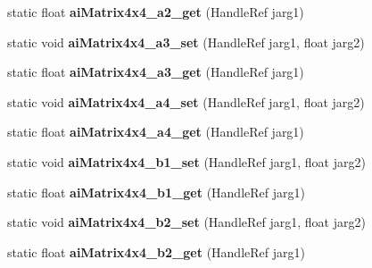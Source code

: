 \begin{DoxyCompactItemize}
\item 
\hypertarget{class_assimp_p_i_n_v_o_k_e_aa40f47aa102f2d9dbb7b108167ca72e9}{static float {\bfseries ai\+Matrix4x4\+\_\+a2\+\_\+get} (Handle\+Ref jarg1)}\label{class_assimp_p_i_n_v_o_k_e_aa40f47aa102f2d9dbb7b108167ca72e9}

\item 
\hypertarget{class_assimp_p_i_n_v_o_k_e_a34d8be79912054933938913ccb5c8338}{static void {\bfseries ai\+Matrix4x4\+\_\+a3\+\_\+set} (Handle\+Ref jarg1, float jarg2)}\label{class_assimp_p_i_n_v_o_k_e_a34d8be79912054933938913ccb5c8338}

\item 
\hypertarget{class_assimp_p_i_n_v_o_k_e_a928ad6beb47bf2ab6b78dbe0eca28973}{static float {\bfseries ai\+Matrix4x4\+\_\+a3\+\_\+get} (Handle\+Ref jarg1)}\label{class_assimp_p_i_n_v_o_k_e_a928ad6beb47bf2ab6b78dbe0eca28973}

\item 
\hypertarget{class_assimp_p_i_n_v_o_k_e_a745cdcf37c74d8b91785ecf8004fc46d}{static void {\bfseries ai\+Matrix4x4\+\_\+a4\+\_\+set} (Handle\+Ref jarg1, float jarg2)}\label{class_assimp_p_i_n_v_o_k_e_a745cdcf37c74d8b91785ecf8004fc46d}

\item 
\hypertarget{class_assimp_p_i_n_v_o_k_e_acdf40885304ca26516e7a23203ebf7cb}{static float {\bfseries ai\+Matrix4x4\+\_\+a4\+\_\+get} (Handle\+Ref jarg1)}\label{class_assimp_p_i_n_v_o_k_e_acdf40885304ca26516e7a23203ebf7cb}

\item 
\hypertarget{class_assimp_p_i_n_v_o_k_e_aabae0682c65f806462e4e9aa87e36da6}{static void {\bfseries ai\+Matrix4x4\+\_\+b1\+\_\+set} (Handle\+Ref jarg1, float jarg2)}\label{class_assimp_p_i_n_v_o_k_e_aabae0682c65f806462e4e9aa87e36da6}

\item 
\hypertarget{class_assimp_p_i_n_v_o_k_e_af5d02d02c470ad27e147fbdd949979b1}{static float {\bfseries ai\+Matrix4x4\+\_\+b1\+\_\+get} (Handle\+Ref jarg1)}\label{class_assimp_p_i_n_v_o_k_e_af5d02d02c470ad27e147fbdd949979b1}

\item 
\hypertarget{class_assimp_p_i_n_v_o_k_e_a588b7819b8ced4b1c41ee160b3a60e1b}{static void {\bfseries ai\+Matrix4x4\+\_\+b2\+\_\+set} (Handle\+Ref jarg1, float jarg2)}\label{class_assimp_p_i_n_v_o_k_e_a588b7819b8ced4b1c41ee160b3a60e1b}

\item 
\hypertarget{class_assimp_p_i_n_v_o_k_e_a10bc1d55eb7eec17c84e5836d28c7c72}{static float {\bfseries ai\+Matrix4x4\+\_\+b2\+\_\+get} (Handle\+Ref jarg1)}\label{class_assimp_p_i_n_v_o_k_e_a10bc1d55eb7eec17c84e5836d28c7c72}


\end{DoxyCompactItemize}
